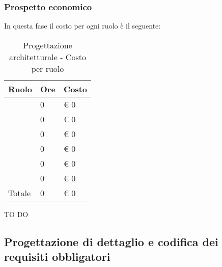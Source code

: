 		
		\subsubsection{Prospetto economico} %
		\label{ssub:prospetto_economico}
		In questa fase il costo per ogni ruolo è il seguente: \\
			\begin{table}[!h]
				\begin{center}
					\begin{tabularx}{0.6\textwidth}{|l|l|X|}
						\hline
						\textbf{Ruolo} & \textbf{Ore} & \textbf{Costo} \\
						\hline
						\roleProjectManager & 0 & \euro{} 0 \\
						\hline
						\roleAnalyst & 0 & \euro{} 0 \\
						\hline
						\roleDesigner & 0 & \euro{} 0 \\
						\hline
						\roleAdministrator & 0 & \euro{} 0 \\
						\hline
						\roleProgrammer & 0 & \euro{} 0 \\
						\hline
						\roleVerifier & 0 & \euro{} 0 \\
						\hline
						Totale & 0 & \euro{} 0 \\
						\hline
					\end{tabularx}
				\end{center}
			\caption{Progettazione architetturale - Costo per ruolo}
			\end{table}
			
		\noindent
		TO DO	
		
	
	\subsection{Progettazione di dettaglio e codifica dei requisiti obbligatori} %
	\label{sub:progettazione_di_dettaglio_e_codifica_dei_requisiti_obbligatori}
